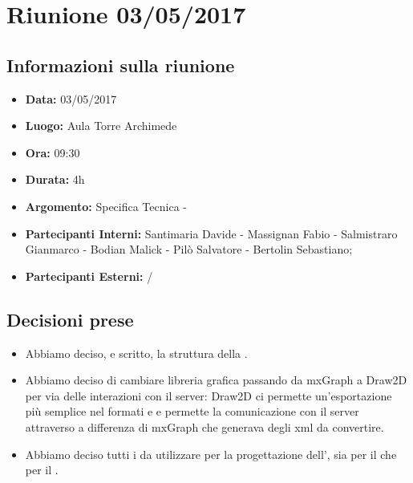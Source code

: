 \section{Riunione 03/05/2017}
  \subsection{Informazioni sulla riunione}
    \begin{itemize}
      \item \textbf{Data: }03/05/2017
      \item \textbf{Luogo: }Aula Torre Archimede
      \item \textbf{Ora: }09:30
      \item \textbf{Durata: }4h
      \item \textbf{Argomento: }Specifica Tecnica - 
      \item \textbf{Partecipanti Interni: }Santimaria Davide - Massignan Fabio - Salmistraro Gianmarco - Bodian Malick - Pilò Salvatore - Bertolin Sebastiano;
      \item \textbf{Partecipanti Esterni: }/
    \end{itemize}
  \subsection{Decisioni prese}
		\begin{itemize}
			\item Abbiamo deciso, e scritto, la struttura della \versioneST{}.
      \item Abbiamo deciso di cambiare libreria grafica passando da mxGraph a Draw2D per via delle interazioni con il server: Draw2D ci permette un'esportazione più semplice
      nel formati  e  e permette la comunicazione con il server attraverso  a differenza di mxGraph che generava degli xml da convertire.
      \item Abbiamo deciso tutti i  da utilizzare per la progettazione dell', sia per il  che per il .
		\end{itemize}
